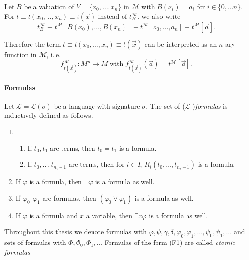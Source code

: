 Let $B$ be a valuation of $V = \lbrace x_0, \ldots, x_n \rbrace$ in $\mathcal{M}$ with $B(x_i)=a_i$ for $i \in \lbrace 0, \ldots n \rbrace$. For $t \equiv t(x_0, \ldots, x_n)\equiv t(\overrightarrow{x}) $ instead of $t_B^\mathcal{M}$, we also write
\[t_B^\mathcal{M} \equiv t^\mathcal{M}[B(x_0), \ldots, B(x_n) ] \equiv t^\mathcal{M}[a_0, \ldots, a_n] \equiv t^\mathcal{M}[\overrightarrow{a}]. \]

Therefore the term $t \equiv t(x_0, \ldots, x_n)\equiv t(\overrightarrow{x})$ can be interpreted as an $n$-ary function in $\mathcal{M}$, i.\,e.\@
\[ f_{t(\overrightarrow{x})}^\mathcal{M} : M^n \rightarrow M \text{ with } f_{t(\overrightarrow{x})}^\mathcal{M}(\overrightarrow{a}) = t^\mathcal{M}[\overrightarrow{a}]. \]



\paragraph{Formulas}
Let $\mathcal{L}=\mathcal{L}(\sigma)$ be a language with signature $\sigma$. The set of ($\mathcal{L}$-)\textit{formulas} is inductively defined as follows.
\begin{enumerate}[label=({F\arabic*})]
\item 
\begin{enumerate}[label=(\alph*)]
\item If $t_0, t_1$ are terms, then $t_0=t_1$ is a formula. 
\item If $t_0, \ldots, t_{n_i-1}$  are terms, then for $i \in I$, $R_i(t_0, \ldots, t_{n_i-1})$ is a formula.
\end{enumerate}
\item If $\varphi$ is a formula, then $\lnot \varphi$ is a formula as well.
\item If $\varphi_0, \varphi_1$ are formulas, then $(\varphi_0 \vee \varphi_1 )$ is a formula as well.
\item If $\varphi$ is a formula and $x$ a variable, then $\exists x \varphi$ is a formula as well.
\end{enumerate}

Throughout this thesis we denote formulas with $\varphi, \psi, \gamma, \delta, \varphi_0, \varphi_1, \ldots, \psi_0, \psi_1, \ldots$ and sets of formulas with $\Phi, \Phi_0, \Phi_1, \ldots$ Formulas of the form (F1) are called \textit{atomic formulas}. 
\\

